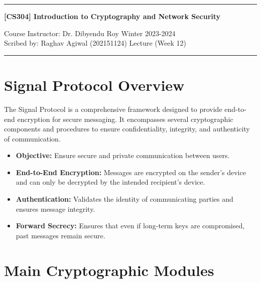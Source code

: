 \documentclass[11pt]{article}
\begin{document}
\noindent
\rule{\textwidth}{1pt}
\begin{center}
{\bf [CS304] Introduction to Cryptography and Network Security}
\end{center}
Course Instructor: Dr. Dibyendu Roy \hfill Winter 2023-2024\\
Scribed by: Raghav Agiwal (202151124) \hfill Lecture (Week 12)
\\
\rule{\textwidth}{1pt}
\setcounter{section}

\section{Signal Protocol Overview}
The Signal Protocol is a comprehensive framework designed to provide end-to-end encryption for secure messaging. It encompasses several cryptographic components and procedures to ensure confidentiality, integrity, and authenticity of communication.

\begin{itemize}
    \item \textbf{Objective:} Ensure secure and private communication between users.
    \item \textbf{End-to-End Encryption:} Messages are encrypted on the sender's device and can only be decrypted by the intended recipient's device.
    \item \textbf{Authentication:} Validates the identity of communicating parties and ensures message integrity.
    \item \textbf{Forward Secrecy:} Ensures that even if long-term keys are compromised, past messages remain secure.
\end{itemize}

\section{Main Cryptographic Modules}
\end{document}
